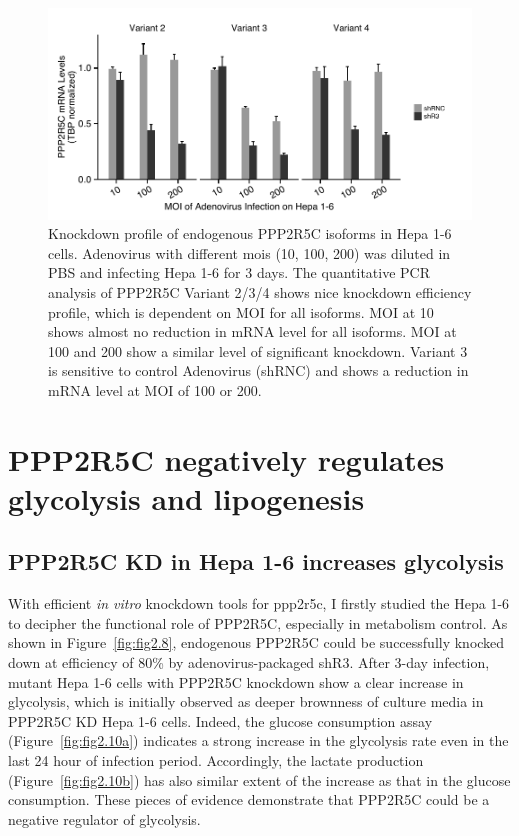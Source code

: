 \begin{figure}[htbp]
\centering
\includegraphics[width=1\textwidth]{figs/fig2-9 hepa ad kd.pdf}
\caption[Knockdown profile of endogenous PPP2R5C in Hepa 1-6]{\footnotesize Knockdown profile of endogenous PPP2R5C isoforms in Hepa 1-6 cells. Adenovirus with different \gls{moi}s (10, 100, 200) was diluted in PBS and infecting Hepa 1-6 for 3 days. The quantitative PCR analysis of PPP2R5C Variant 2/3/4 shows nice knockdown efficiency profile, which is dependent on MOI for all isoforms. MOI at 10 shows almost no reduction in mRNA level for all isoforms. MOI at 100 and 200 show a similar level of significant knockdown. Variant 3 is sensitive to control Adenovirus (shRNC) and shows a reduction in mRNA level at MOI of 100 or 200. }
\label{fig:fig2.9}
\end{figure}


\section{PPP2R5C negatively regulates glycolysis and lipogenesis}\label{sec:sec2.3}

\subsection{PPP2R5C KD in Hepa 1-6 increases glycolysis}

With efficient \textit{in vitro} knockdown tools for \gls{ppp2r5c}, I firstly studied the Hepa 1-6 to decipher the functional role of PPP2R5C, especially in metabolism control. As shown in Figure~\ref{fig:fig2.8}, endogenous PPP2R5C could be successfully knocked down at efficiency of 80\% by adenovirus-packaged shR3. After 3-day infection, mutant Hepa 1-6 cells with PPP2R5C knockdown show a clear increase in glycolysis, which is initially observed as deeper brownness of culture media in PPP2R5C KD Hepa 1-6 cells. Indeed, the glucose consumption assay (Figure~\ref{fig:fig2.10a}) indicates a strong increase in the glycolysis rate even in the last 24 hour of infection period. Accordingly, the lactate production (Figure~\ref{fig:fig2.10b}) has also similar extent of the increase as that in the glucose consumption. These pieces of evidence demonstrate that PPP2R5C could be a negative regulator of glycolysis.

